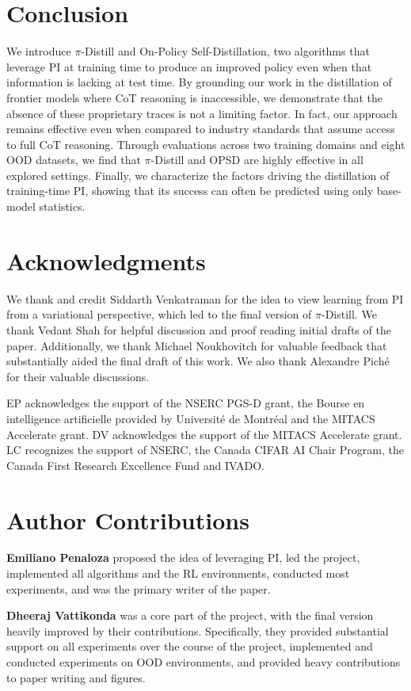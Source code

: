 \documentclass[]{servicenow} %
\begin{document}
\section{Conclusion}
We introduce $\pi$-Distill and On-Policy Self-Distillation, two algorithms that leverage PI at training time to produce an improved policy even when that information is lacking at test time. By grounding our work in the distillation of frontier models where CoT reasoning is inaccessible, we demonstrate that the absence of these proprietary traces is not a limiting factor. In fact, our approach remains effective even when compared to industry standards that assume access to full CoT reasoning. Through evaluations across two training domains and eight OOD datasets, we find that $\pi$-Distill and OPSD are highly effective in all explored settings. Finally, we characterize the factors driving the distillation of training-time PI, showing that its success can often be predicted using only base-model statistics.

\section{Acknowledgments} 
We thank and credit Siddarth Venkatraman for the idea to view learning from PI from a variational perspective, which led to the final version of $\pi$-Distill. We thank Vedant Shah for helpful discussion and proof reading initial drafts of the paper. Additionally, we thank Michael Noukhovitch for valuable feedback that substantially aided the final draft of this work. We also thank Alexandre Piché for their valuable discussions. 

EP acknowledges the support of the NSERC PGS-D grant, the
Bourse en intelligence artificielle provided by Université
de Montréal and the MITACS Accelerate grant. DV acknowledges the support of the MITACS Accelerate grant. LC recognizes the support of NSERC, the Canada CIFAR
AI Chair Program, the Canada First Research Excellence
Fund and IVADO.


\section{Author Contributions}

\textbf{Emiliano Penaloza} proposed the idea of leveraging PI, led the project, implemented all algorithms and the RL environments, conducted most experiments, and was the primary writer of the paper. 

\textbf{Dheeraj Vattikonda} was a core part of the project, with the final version heavily improved by their contributions. Specifically, they provided substantial support on all experiments over the course of the project, implemented and conducted experiments on OOD environments, and provided heavy contributions to paper writing and figures.  
\end{document}
